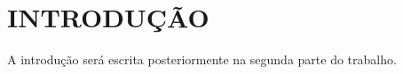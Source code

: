 
\chapter{INTRODUÇÃO}\label{cap1}


A introdução será escrita posteriormente na segunda parte do trabalho.